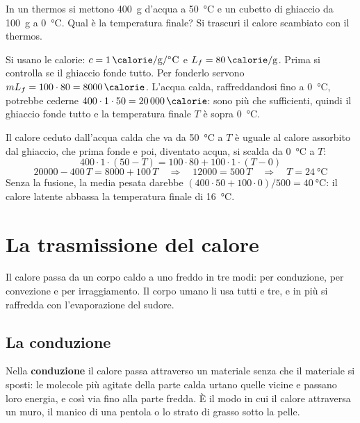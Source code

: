 \begin{esempio}
In un thermos si mettono \SI{400}{\gram} d'acqua a \SI{50}{\celsius} e un cubetto di ghiaccio da \SI{100}{\gram} a \SI{0}{\celsius}. Qual è la temperatura finale? Si trascuri il calore scambiato con il thermos.

Si usano le calorie: $c = \SI{1}{\calorie\per\gram\per\celsius}$ e $L_f = \SI{80}{\calorie\per\gram}$. Prima si controlla se il ghiaccio fonde tutto. Per fonderlo servono $m L_f = 100 \cdot 80 = \SI{8000}{\calorie}$. L'acqua calda, raffreddandosi fino a \SI{0}{\celsius}, potrebbe cederne $400 \cdot 1 \cdot 50 = \SI{20000}{\calorie}$: sono più che sufficienti, quindi il ghiaccio fonde tutto e la temperatura finale $T$ è sopra \SI{0}{\celsius}.

Il calore ceduto dall'acqua calda che va da \SI{50}{\celsius} a $T$ è uguale al calore assorbito dal ghiaccio, che prima fonde e poi, diventato acqua, si scalda da \SI{0}{\celsius} a $T$:
\[
  400 \cdot 1 \cdot (50 - T) = 100 \cdot 80 + 100 \cdot 1 \cdot (T - 0)
\]
\[
  20000 - 400\,T = 8000 + 100\,T
  \quad\Longrightarrow\quad
  12000 = 500\,T
  \quad\Longrightarrow\quad
  T = \SI{24}{\celsius}
\]
Senza la fusione, la media pesata darebbe $(400 \cdot 50 + 100 \cdot 0)/500 = \SI{40}{\celsius}$: il calore latente abbassa la temperatura finale di \SI{16}{\celsius}.
\end{esempio}



\section{La trasmissione del calore}
\label{sec:ud5-trasmissione}

Il calore passa da un corpo caldo a uno freddo in tre modi: per conduzione, per convezione e per irraggiamento. Il corpo umano li usa tutti e tre, e in più si raffredda con l'evaporazione del sudore.

\subsection{La conduzione}

Nella \textbf{conduzione} il calore passa attraverso un materiale senza che il materiale si sposti: le molecole più agitate della parte calda urtano quelle vicine e passano loro energia, e così via fino alla parte fredda. È il modo in cui il calore attraversa un muro, il manico di una pentola o lo strato di grasso sotto la pelle.

